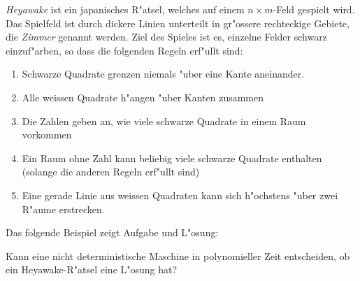 {\em Heyawake} ist ein japanisches R"atsel, welches auf einem $n\times m$-Feld
gespielt wird. Das Spielfeld ist durch dickere Linien unterteilt in gr"ossere rechteckige Gebiete, die {\it Zimmer} genannt werden. 
Ziel des Spieles ist es, einzelne Felder schwarz einzuf"arben, so dass die
folgenden Regeln erf"ullt sind:
\begin{enumerate}
\item
Schwarze Quadrate grenzen niemals "uber eine Kante aneinander.
\item
Alle weissen Quadrate h"angen "uber Kanten zusammen
\item
Die Zahlen geben an, wie viele schwarze Quadrate in einem Raum vorkommen
\item
Ein Raum ohne Zahl kann beliebig viele schwarze Quadrate enthalten
(solange die anderen Regeln erf"ullt sind)
\item
Eine gerade Linie aus weissen Quadraten kann sich h"ochstens "uber zwei
R"aume erstrecken.
\end{enumerate}
Das folgende Beispiel zeigt Aufgabe und L"osung:
\begin{center}
\qquad
{}
\end{center}

Kann eine nicht deterministische Maschine in polynomieller Zeit entscheiden,
ob ein Heyawake-R"atsel eine L"osung hat?


